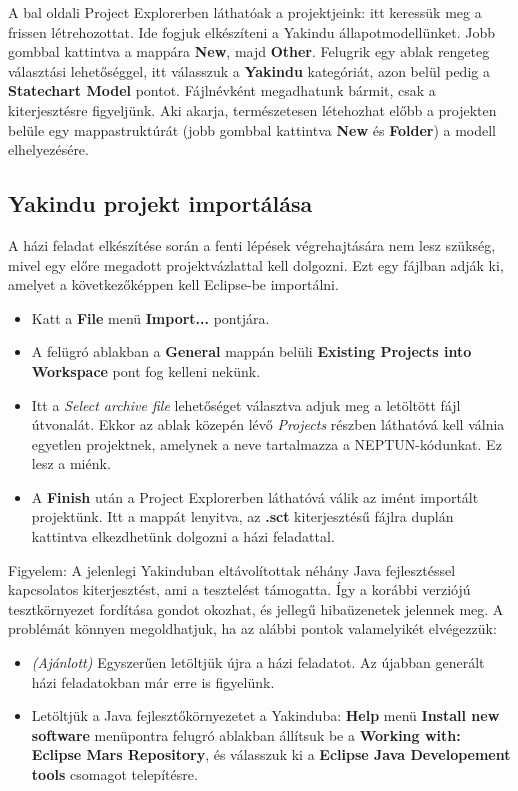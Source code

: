 A bal oldali Project Explorerben láthatóak a projektjeink: itt keressük meg a frissen létrehozottat. Ide fogjuk elkészíteni a Yakindu állapotmodellünket. Jobb gombbal kattintva a mappára \textbf{New}, majd \textbf{Other}. Felugrik egy ablak rengeteg választási lehetőséggel, itt válasszuk a \textbf{Yakindu} kategóriát, azon belül pedig a \textbf{Statechart Model} pontot. Fájlnévként megadhatunk bármit, csak a  kiterjesztésre figyeljünk. Aki akarja, természetesen létehozhat előbb a projekten belüle egy mappastruktúrát (jobb gombbal kattintva \textbf{New} és \textbf{Folder}) a modell elhelyezésére.

\subsection{Yakindu projekt importálása}
\label{sec:yakindu-projekt-importalasa}

A házi feladat elkészítése során a fenti lépések végrehajtására nem lesz szükség, mivel egy előre megadott projektvázlattal kell dolgozni. Ezt egy  fájlban adják ki, amelyet a következőképpen kell Eclipse-be importálni.

\begin{itemize}
	\item Katt a \textbf{File} menü \textbf{Import...} pontjára.
	\item A felügró ablakban a \textbf{General} mappán belüli \textbf{Existing Projects into Workspace} pont fog kelleni nekünk.
	\item Itt a \emph{Select archive file} lehetőséget választva adjuk meg a letöltött  fájl útvonalát. Ekkor az ablak közepén lévő \emph{Projects} részben láthatóvá kell válnia egyetlen projektnek, amelynek a neve tartalmazza a NEPTUN-kódunkat. Ez lesz a miénk.
	\item A \textbf{Finish} után a Project Explorerben láthatóvá válik az imént importált projektünk. Itt a mappát lenyitva, az \textbf{.sct} kiterjesztésű fájlra duplán kattintva elkezdhetünk dolgozni a házi feladattal.
\end{itemize}

\begin{megjegyzes}
Figyelem: A jelenlegi Yakinduban eltávolítottak néhány Java fejlesztéssel kapcsolatos kiterjesztést, ami a tesztelést támogatta. Így a korábbi verziójú tesztkörnyezet fordítása gondot okozhat, és  jellegű hibaüzenetek jelennek meg. A problémát könnyen megoldhatjuk, ha az alábbi pontok valamelyikét elvégezzük:
\begin{itemize}
  \item \emph {(Ajánlott)} Egyszerűen letöltjük újra a házi feladatot. Az újabban generált házi feladatokban már erre is figyelünk.
  \item Letöltjük a Java fejlesztőkörnyezetet a Yakinduba: \textbf{Help} menü  \textbf{Install new software} menüpontra felugró ablakban állítsuk be a \textbf{Working with: Eclipse Mars Repository}, és válasszuk ki a \textbf{Eclipse Java Developement tools} csomagot telepítésre.
\end{itemize}
\end{megjegyzes}


